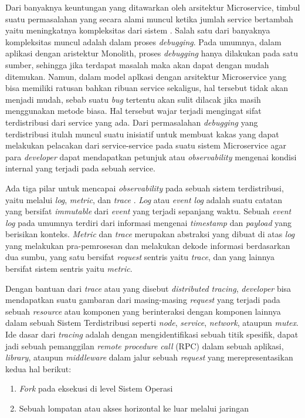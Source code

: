 Dari banyaknya keuntungan yang ditawarkan oleh arsitektur Microservice, timbul suatu permasalahan yang secara alami muncul ketika jumlah service bertambah yaitu meningkatnya kompleksitas dari sistem \citep{fowler-complexity}. Salah satu dari banyaknya kompleksitas muncul adalah dalam proses \textit{debugging}. Pada umumnya, dalam aplikasi dengan aristektur Monolith, proses \textit{debugging} hanya dilakukan pada satu sumber, sehingga jika terdapat masalah maka akan dapat dengan mudah ditemukan. Namun, dalam model aplkasi dengan arsitektur Microservice yang bisa memiliki ratusan bahkan ribuan service sekaligus, hal tersebut tidak akan menjadi mudah, sebab suatu \textit{bug} tertentu akan sulit dilacak jika masih menggunakan metode biasa. Hal tersebut wajar terjadi mengingat sifat terdistribusi dari service yang ada. Dari permasalahan \textit{debugging} yang terdistribusi itulah muncul suatu inisiatif untuk membuat kakas yang dapat melakukan pelacakan dari service-service pada suatu sistem Microservice agar para \textit{developer} dapat mendapatkan petunjuk atau \textit{observability} mengenai kondisi internal yang terjadi pada sebuah service.

Ada tiga pilar untuk mencapai \textit{observability} pada sebuah sistem terdistribusi, yaitu melalui \textit{log}, \textit{metric}, dan \textit{trace} \citep{sridharan2018distributed}. \textit{Log} atau \textit{event log} adalah suatu catatan yang bersifat \textit{immutable} dari \textit{event} yang terjadi sepanjang waktu. Sebuah \textit{event log} pada umumnya terdiri dari informasi mengenai \textit{timestamp} dan \textit{payload} yang berisikan konteks. \textit{Metric} dan \textit{trace} merupakan abstraksi yang dibuat di atas \textit{log} yang melakukan pra-pemrosesan dan melakukan dekode informasi berdasarkan dua sumbu, yang satu bersifat \textit{request} sentris yaitu \textit{trace}, dan yang lainnya bersifat sistem sentris yaitu \textit{metric}.

 Dengan bantuan dari \textit{trace} atau yang disebut \textit{distributed tracing}, \textit{developer} bisa mendapatkan suatu gambaran dari masing-masing \textit{request} yang terjadi pada sebuah \textit{resource} atau komponen yang berinteraksi dengan komponen lainnya dalam sebuah Sistem Terdistribusi seperti \textit{node}, \textit{service}, \textit{network}, ataupun \textit{mutex}. Ide dasar dari \textit{tracing}  adalah dengan mengidentifikasi sebuah titik spesifik, dapat jadi sebuah pemanggilan \textit{remote procedure call} (RPC) dalam sebuah aplikasi, \textit{library}, ataupun \textit{middleware} dalam jalur sebuah \textit{request} yang merepresentasikan kedua hal berikut:
\begin{enumerate}
	\item \textit{Fork} pada eksekusi di level Sistem Operasi
	\item Sebuah lompatan atau akses horizontal ke luar melalui jaringan
\end{enumerate}


